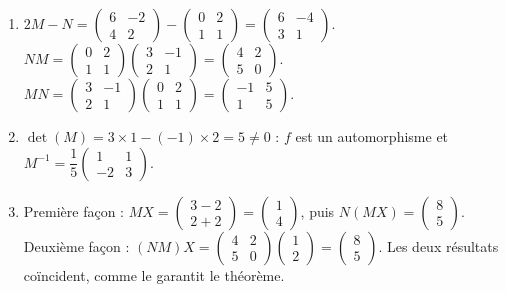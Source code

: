 \documentclass[11pt]{article}
\begin{document}
\begin{corrige}[Exercice]
\begin{enumerate}
\item $2M - N = \begin{pmatrix} 6 & -2 \\ 4 & 2 \end{pmatrix} - \begin{pmatrix} 0 & 2 \\ 1 & 1 \end{pmatrix} = \begin{pmatrix} 6 & -4 \\ 3 & 1 \end{pmatrix}$. \quad $NM = \begin{pmatrix} 0 & 2 \\ 1 & 1 \end{pmatrix}\begin{pmatrix} 3 & -1 \\ 2 & 1 \end{pmatrix} = \begin{pmatrix} 4 & 2 \\ 5 & 0 \end{pmatrix}$. \quad $MN = \begin{pmatrix} 3 & -1 \\ 2 & 1 \end{pmatrix}\begin{pmatrix} 0 & 2 \\ 1 & 1 \end{pmatrix} = \begin{pmatrix} -1 & 5 \\ 1 & 5 \end{pmatrix}$.
\item $\det(M) = 3\times 1 - (-1)\times 2 = 5 \neq 0$ : $f$ est un automorphisme et $M^{-1} = \dfrac{1}{5}\begin{pmatrix} 1 & 1 \\ -2 & 3 \end{pmatrix}$.
\item Première façon : $MX = \begin{pmatrix} 3-2 \\ 2+2 \end{pmatrix} = \begin{pmatrix} 1 \\ 4 \end{pmatrix}$, puis $N(MX) = \begin{pmatrix} 8 \\ 5 \end{pmatrix}$. Deuxième façon : $(NM)X = \begin{pmatrix} 4 & 2 \\ 5 & 0 \end{pmatrix}\begin{pmatrix} 1 \\ 2 \end{pmatrix} = \begin{pmatrix} 8 \\ 5 \end{pmatrix}$. Les deux résultats coïncident, comme le garantit le théorème.
\end{enumerate}
\end{corrige}
\end{document}
